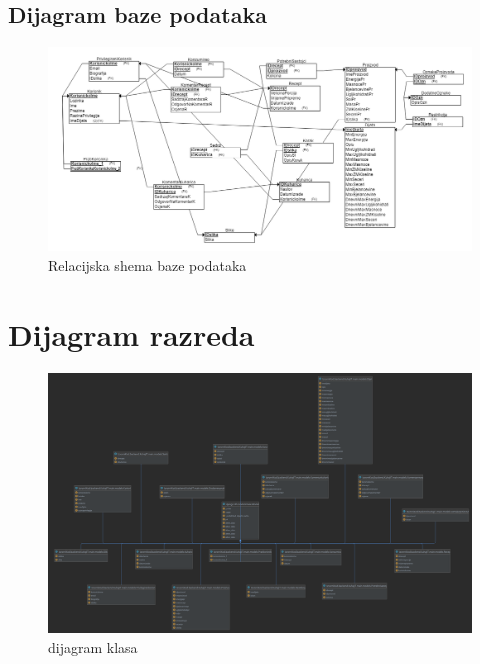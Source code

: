 \subsection{Dijagram baze podataka}
			\begin{figure}[H]
					\centering
					\includegraphics[scale=0.4]{slike/REL-model-baze.png}
					\caption{Relacijska shema baze podataka}
					\label{fig:REL-model-baze}
				\end{figure} 
			\eject
			
			
		\section{Dijagram razreda}
			\begin{figure}[H]
				\centering
				\includegraphics[scale=0.08]{dijagrami/dijagram-klasa.png}
				\caption{dijagram klasa}
				\label{fig:klase}
			\end{figure}
			
